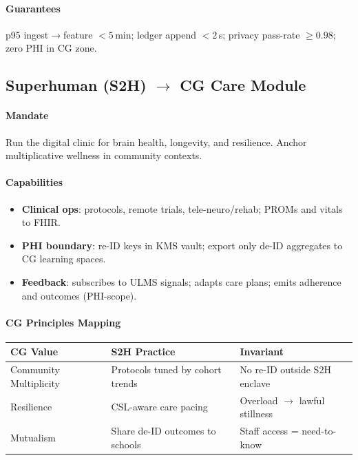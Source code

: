 \documentclass[11pt]{article}
\theoremstyle{plain}
\begin{document}
\paragraph{Guarantees}
p95 ingest$\rightarrow$feature $<5$\,min; ledger append $<2$\,s; privacy pass-rate $\ge0.98$; zero PHI in CG zone.

\bigskip
\subsection*{Superhuman (S2H) $\rightarrow$ CG Care Module}
\paragraph{Mandate}
Run the digital clinic for brain health, longevity, and resilience. Anchor multiplicative wellness in community contexts.

\paragraph{Capabilities}
\begin{itemize}
  \item \textbf{Clinical ops}: protocols, remote trials, tele-neuro/rehab; PROMs and vitals to FHIR.
  \item \textbf{PHI boundary}: re-ID keys in KMS vault; export only de-ID aggregates to CG learning spaces.
  \item \textbf{Feedback}: subscribes to ULMS signals; adapts care plans; emits adherence and outcomes (PHI-scope).
\end{itemize}

\paragraph{CG Principles Mapping}
\begin{center}
\begin{tabular}{l l l}
\hline
CG Value & S2H Practice & Invariant \\
\hline
Community Multiplicity & Protocols tuned by cohort trends & No re-ID outside S2H enclave \\
Resilience & CSL-aware care pacing & Overload $\rightarrow$ lawful stillness \\
Mutualism & Share de-ID outcomes to schools & Staff access = need-to-know \\
\hline
\end{tabular}
\end{center}
\end{document}
